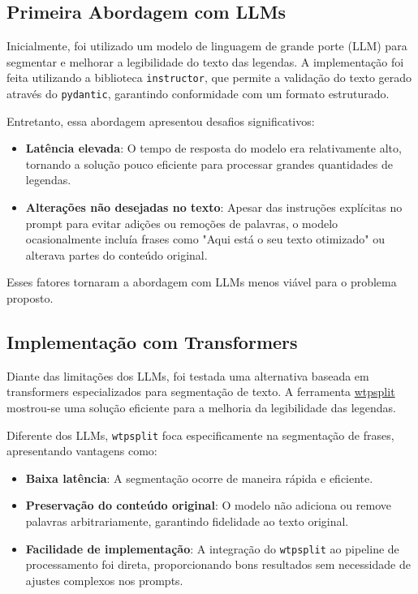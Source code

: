 \documentclass[tcc,capa]{texufpel}
\begin{document}
\subsection{Primeira Abordagem com LLMs}
Inicialmente, foi utilizado um modelo de linguagem de grande porte (LLM) para segmentar e melhorar a legibilidade do texto das legendas. A implementação foi feita utilizando a biblioteca \texttt{instructor}, que permite a validação do texto gerado através do \texttt{pydantic}, garantindo conformidade com um formato estruturado.

Entretanto, essa abordagem apresentou desafios significativos:
\begin{itemize}
    \item \textbf{Latência elevada}: O tempo de resposta do modelo era relativamente alto, tornando a solução pouco eficiente para processar grandes quantidades de legendas.
    \item \textbf{Alterações não desejadas no texto}: Apesar das instruções explícitas no prompt para evitar adições ou remoções de palavras, o modelo ocasionalmente incluía frases como "Aqui está o seu texto otimizado" ou alterava partes do conteúdo original.
\end{itemize}

Esses fatores tornaram a abordagem com LLMs menos viável para o problema proposto.

\subsection{Implementação com Transformers}
Diante das limitações dos LLMs, foi testada uma alternativa baseada em transformers especializados para segmentação de texto. A ferramenta \href{https://github.com/segment-any-text/wtpsplit}{wtpsplit} mostrou-se uma solução eficiente para a melhoria da legibilidade das legendas.

Diferente dos LLMs, \texttt{wtpsplit} foca especificamente na segmentação de frases, apresentando vantagens como:
\begin{itemize}
    \item \textbf{Baixa latência}: A segmentação ocorre de maneira rápida e eficiente.
    \item \textbf{Preservação do conteúdo original}: O modelo não adiciona ou remove palavras arbitrariamente, garantindo fidelidade ao texto original.
    \item \textbf{Facilidade de implementação}: A integração do \texttt{wtpsplit} ao pipeline de processamento foi direta, proporcionando bons resultados sem necessidade de ajustes complexos nos prompts.
\end{itemize}
\end{document}
